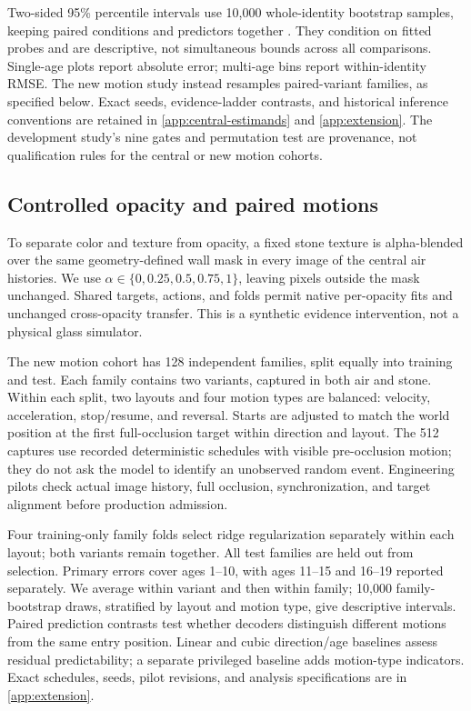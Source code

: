 \documentclass{article}
\begin{document}
Two-sided 95\% percentile intervals use 10,000 whole-identity bootstrap samples,
keeping paired conditions and predictors together \citep{efron1993bootstrap}.
They condition on fitted probes and are descriptive, not simultaneous bounds
across all comparisons. Single-age plots report absolute error; multi-age bins
report within-identity RMSE. The new motion study instead resamples paired-variant
families, as specified below. Exact seeds, evidence-ladder contrasts, and historical
inference conventions are retained in \autoref{app:central-estimands} and
\autoref{app:extension}. The development study's nine gates and permutation test
are provenance, not qualification rules for the central or new motion cohorts.

\subsection{Controlled opacity and paired motions}
\label{sec:fresh-method}
To separate color and texture from opacity, a fixed stone texture is alpha-blended over the same geometry-defined wall mask in every image of the central air histories. We use $\alpha\in\{0,0.25,0.5,0.75,1\}$, leaving pixels outside the mask unchanged. Shared targets, actions, and folds permit native per-opacity fits and unchanged cross-opacity transfer. This is a synthetic evidence intervention, not a physical glass simulator.

The new motion cohort has 128 independent families, split equally into training and test. Each family contains two variants, captured in both air and stone. Within each split, two layouts and four motion types are balanced: velocity, acceleration, stop/resume, and reversal. Starts are adjusted to match the world position at the first full-occlusion target within direction and layout. The 512 captures use recorded deterministic schedules with visible pre-occlusion motion; they do not ask the model to identify an unobserved random event. Engineering pilots check actual image history, full occlusion, synchronization, and target alignment before production admission.

Four training-only family folds select ridge regularization separately within each layout; both variants remain together. All test families are held out from selection. Primary errors cover ages 1--10, with ages 11--15 and 16--19 reported separately. We average within variant and then within family; 10,000 family-bootstrap draws, stratified by layout and motion type, give descriptive intervals. Paired prediction contrasts test whether decoders distinguish different motions from the same entry position. Linear and cubic direction/age baselines assess residual predictability; a separate privileged baseline adds motion-type indicators. Exact schedules, seeds, pilot revisions, and analysis specifications are in \autoref{app:extension}.
\end{document}
